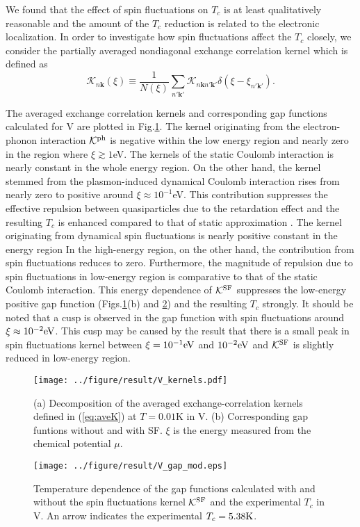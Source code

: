We found that the effect of spin fluctuations on $T_c$ is at least qualitatively reasonable and 
the amount of the $T_c$ reduction is related to the electronic localization.
In order to investigate how spin fluctuations affect the $T_c$ closely, we 
consider the partially averaged nondiagonal exchange correlation kernel which is defined as
%
\begin{equation}
	\mathcal K_{n\bm k}(\xi) \equiv \frac{1}{N(\xi)}
	\sum_{n'\bm k'} \mathcal K_{n\bm k n'\bm k'}\delta(\xi - \xi_{n'\bm k'}).
	\label{eq:aveK}
\end{equation}
%

The averaged exchange correlation kernels and corresponding gap functions calculated for V 
are plotted in Fig.\ref{fig:Vaveker}. The kernel originating from the electron-phonon interaction
$\mathcal K^{\rm ph}$ is negative within the low energy region and nearly zero in the region 
where $\xi \gtrsim 1$eV. The kernels of the static Coulomb interaction is nearly constant in the
whole energy region. On the other hand, the kernel stemmed from the plasmon-induced dynamical
Coulomb interaction rises from nearly zero to positive around $\xi \approx 10^{-1}$eV.
This contribution suppresses the effective repulsion between quasiparticles due to the 
retardation effect and the resulting $T_c$ is enhanced compared to that of static approximation
\cite{RA2013}.
The kernel originating from dynamical spin fluctuations is nearly positive constant in the energy region 
In the high-energy region, on the other hand, the contribution from spin fluctuations reduces to zero. 
Furthermore, the magnitude of repulsion due to spin fluctuations in low-energy region is comparative 
to that of the static Coulomb interaction. This energy dependence of
$\mathcal K^{\rm SF}$ suppresses the low-energy positive gap function (Figs.\ref{fig:Vaveker}(b)
and \ref{fig:VgapT}) and
the resulting $T_c$ strongly.
It should be noted that a cusp is observed in the gap function with spin fluctuations 
around $\xi \approx 10^{-2}{\rm eV}$. This cusp may be caused by the result that there is a small
peak in spin fluctuations kernel between $\xi = 10^{-1}{\rm eV}$ and $10^{-2}{\rm eV}$ and
$\mathcal K^{\rm SF}$ is slightly reduced in low-energy region.

%
\begin{figure}[h]
	\centering
	\texttt{[image: ../figure/result/V\_kernels.pdf]}
	\caption{(a) Decomposition of the averaged exchange-correlation kernels defined in 
		(\ref{eq:aveK}) at $T=0.01$K in V. (b) Corresponding gap funtions without 
	and with SF. $\xi$ is the energy measured from the chemical potential $\mu$.}
	\label{fig:Vaveker}
\end{figure}
%
\begin{figure}[h]
	\centering
	\texttt{[image: ../figure/result/V\_gap\_mod.eps]}
	\caption{Temperature dependence of the gap functions calculated with and without 
		the spin fluctuations kernel $\mathcal K^{\rm SF}$ and the experimental $T_c$ in V.
		An arrow indicates the experimental $T_c = 5.38{\rm K}$.}
	\label{fig:VgapT}
\end{figure}
%

